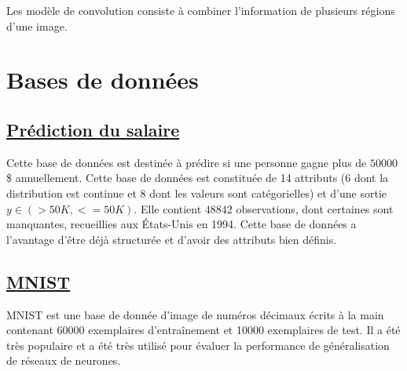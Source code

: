 \documentclass[12pt,letterpaper]{article}
\begin{document}
Les modèle de convolution consiste à combiner l'information de plusieurs
régions d'une image.

\section{Bases de données}
\subsection{\href{http://archive.ics.uci.edu/ml/datasets/Adult}{Prédiction du salaire}}

Cette base de données est destinée à prédire si une personne gagne plus
de $50 000$\$ annuellement. Cette base de données est constituée de 14 attributs
(6 dont la distribution est continue et 8 dont les valeurs sont catégorielles)
et d'une sortie $y \in \left( >50K, <=50K \right)$. Elle contient $48 842$
observations, dont certaines sont manquantes, recueillies aux États-Unis en
1994. Cette base de données a l'avantage d'être déjà structurée et d'avoir des
attributs bien définis.

\subsection{\href{http://yann.lecun.com/exdb/mnist/}{MNIST}}

MNIST est une base de donnée d'image de numéros décimaux écrits à la main
contenant 60000 exemplaires d'entraînement et 10000 exemplaires de test. Il a
été très populaire et a été très utilisé pour évaluer la performance de
généralisation de réseaux de neurones. 
\end{document}
